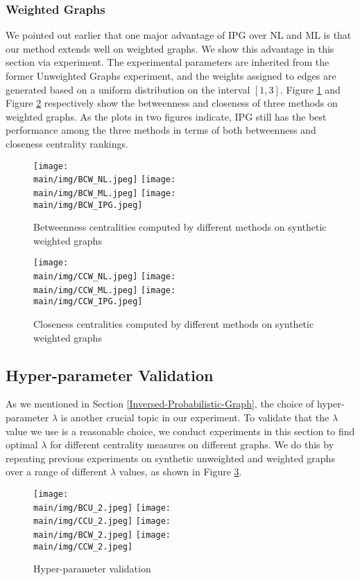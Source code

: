 \documentclass[\main/thesis.tex]{subfiles}
\begin{document}
\subsubsection{Weighted Graphs}
We pointed out earlier that one major advantage of IPG over NL and ML is that our method extends well on weighted graphs. We show this advantage in this section via experiment. The experimental parameters are inherited from the former Unweighted Graphs experiment, and the weights assigned to edges are generated based on a uniform distribution on the interval $[1,3]$. Figure \ref{btw_weighted} and Figure \ref{cl_weighted} respectively show the betweenness and closeness of three methods on weighted graphs. As the plots in two figures indicate, IPG still has the best performance among the three methods in terms of both betweenness and closeness centrality rankings.

\begin{figure}
\texttt{[image: \\main/img/BCW\_NL.jpeg]}
\texttt{[image: \\main/img/BCW\_ML.jpeg]}
\centering
\texttt{[image: \\main/img/BCW\_IPG.jpeg]}
\caption{Betweenness centralities computed by different methods on synthetic weighted graphs}
\label{btw_weighted}
\end{figure}


\begin{figure}
\texttt{[image: \\main/img/CCW\_NL.jpeg]}
\texttt{[image: \\main/img/CCW\_ML.jpeg]}
\centering
\texttt{[image: \\main/img/CCW\_IPG.jpeg]}
\caption{Closeness centralities computed by different methods on synthetic weighted graphs}
\label{cl_weighted}
\end{figure}


\subsection{Hyper-parameter Validation} \label{Hyper-Parameter-Validation}
As we mentioned in Section \ref{Inversed-Probabilistic-Graph}, the choice of hyper-parameter $\lambda$ is another crucial topic in our experiment. To validate that the $\lambda$ value we use is a reasonable choice, we conduct experiments in this section to find optimal $\lambda$ for different centrality measures on different graphs. We do this by repeating previous experiments on synthetic unweighted and weighted graphs over a range of different $\lambda$ values, as shown in Figure \ref{hyper}.

\begin{figure}
\texttt{[image: \\main/img/BCU\_2.jpeg]}
\texttt{[image: \\main/img/CCU\_2.jpeg]}
\texttt{[image: \\main/img/BCW\_2.jpeg]}
\texttt{[image: \\main/img/CCW\_2.jpeg]}
\caption{Hyper-parameter validation}
\label{hyper}
\end{figure}
\end{document}
